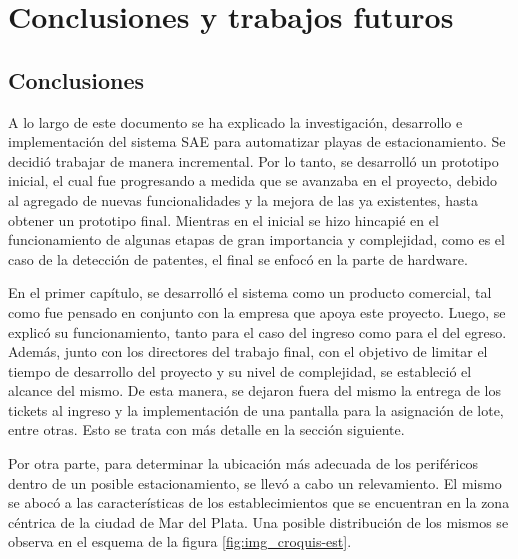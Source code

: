 \chapter{Conclusiones y trabajos futuros}  \label{cap:Conclusiones}

\section{Conclusiones}

A lo largo de este documento se ha explicado la investigación, desarrollo e implementación del sistema SAE para automatizar playas de estacionamiento. Se decidió trabajar de manera incremental. Por lo tanto, se desarrolló un prototipo inicial, el cual fue progresando a medida que se avanzaba en el proyecto, debido al agregado de nuevas funcionalidades y la mejora de las ya existentes, hasta obtener un prototipo final. Mientras en el inicial se hizo hincapié en el funcionamiento de algunas etapas de gran importancia y complejidad, como es el caso de la detección de patentes, el final se enfocó en la parte de hardware. 

En el primer capítulo, se desarrolló el sistema como un producto comercial, tal como fue pensado en conjunto con la empresa que apoya este proyecto. Luego, se explicó su funcionamiento, tanto para el caso del ingreso como para el del egreso. Además, junto con los directores del trabajo final, con el objetivo de limitar el tiempo de desarrollo del proyecto y su nivel de complejidad, se estableció el alcance del mismo. De esta manera, se dejaron fuera del mismo la entrega de los tickets al ingreso y la implementación de una pantalla para  la asignación de lote, entre otras. Esto se trata con más detalle en la sección siguiente.

Por otra parte, para determinar la ubicación más adecuada de los periféricos dentro de un posible estacionamiento, se llevó a cabo un relevamiento. El mismo se abocó a las características de los establecimientos que se encuentran en la zona céntrica de la ciudad de Mar del Plata. Una posible distribución de los mismos se observa en el esquema de la figura \ref{fig:img_croquis-est}.

